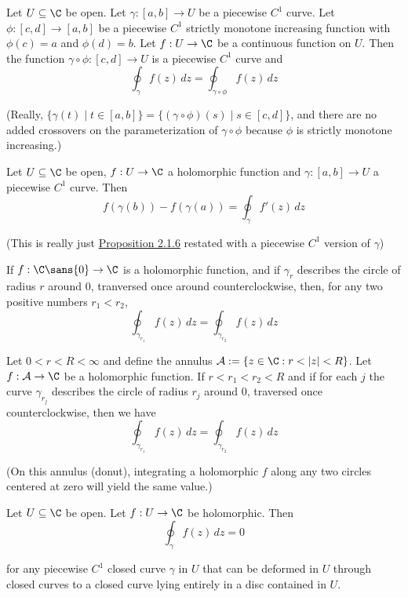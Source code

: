 \label{b6b6d51}

Let $U\subseteq\C$ be open. Let $\gamma:[a,b]\to U$ be a piecewise $C^1$ curve.
Let $\phi:[c,d]\to[a,b]$ be a piecewise $C^1$ strictly monotone increasing
function with $\phi(c)=a$ and $\phi(d)=b$. Let $f:U\to\C$ be a continuous
function on $U$. Then the function $\gamma\circ\phi:[c,d]\to U$ is a piecewise
$C^1$ curve and
$$\oint_\gamma f(z)\,dz=\oint_{\gamma\circ\phi}f(z)\,dz$$

(Really, $\{\gamma(t)\mid t\in[a,b]\}=\{(\gamma\circ\phi)(s)\mid s
\in[c,d]\}$, and there are no added crossovers on the parameterization
of $\gamma\circ\phi$ because $\phi$ is strictly monotone increasing.)

\label{cd28a8f}

Let $U\subseteq\C$ be open, $f:U\to\C$ a holomorphic function and
$\gamma:[a,b]\to U$ a piecewise $C^1$ curve. Then
$$
  f(\gamma(b))-f(\gamma(a))=\oint_\gamma f'(z)\,dz
$$

(This is really just \href{c526c09}{Proposition 2.1.6} restated
with a piecewise $C^1$ version of $\gamma$)

\label{b52bca5}

If $f:\C\sans{0}\to\C$ is a holomorphic function, and if $\gamma_r$ describes
the circle of radius $r$ around $0$, tranversed once around counterclockwise,
then, for any two positive numbers $r_1<r_2$,
$$
  \oint_{\gamma_{r_1}}f(z)\,dz=\oint_{\gamma_{r_2}}f(z)\,dz
$$

\label{ecbc559}

Let $0<r<R<\infty$ and define the annulus $\mathcal A:=\{z\in\C:r<|z|<R\}$. Let
$f:\mathcal A\to\C$ be a holomorphic function. If $r<r_1<r_2<R$ and if for each
$j$ the curve $\gamma_{r_j}$ describes the circle of radius $r_j$ around 0,
traversed once counterclockwise, then we have
$$
  \oint_{\gamma_{r_1}}f(z)\,dz=\oint_{\gamma_{r_2}}f(z)\,dz
$$

(On this annulus (donut), integrating a holomorphic $f$ along any two
circles centered at zero will yield the same value.)

\label{be5c80c}

Let $U\subseteq\C$ be open. Let $f:U\to\C$ be holomorphic. Then
$$\oint_\gamma f(z)\,dz=0$$

for any piecewise $C^1$ closed curve $\gamma$ in $U$ that can be deformed in
$U$ through closed curves to a closed curve lying entirely in a disc contained
in $U$.

